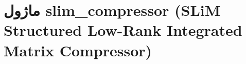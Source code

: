\section{ماژول slim\_compressor (SLiM Structured Low-Rank Integrated Matrix Compressor)}
\label{sec:module_slim_compressor}
